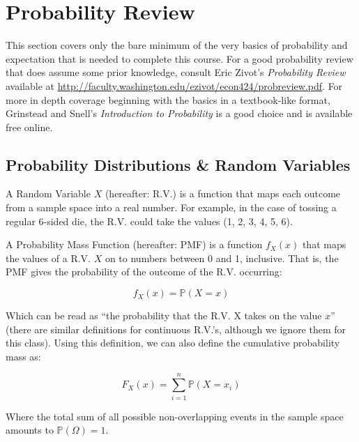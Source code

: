 \documentclass[]{book}
\theoremstyle{definition}
\theoremstyle{definition}
\theoremstyle{definition}
\theoremstyle{remark}
\begin{document}
\section*{Probability Review}\label{probability-review}

This section covers only the bare minimum of the very basics of
probability and expectation that is needed to complete this course. For
a good probability review that does assume some prior knowledge, consult
Eric Zivot's \emph{Probability Review} available at
\url{http://faculty.washington.edu/ezivot/econ424/probreview.pdf}. For
more in depth coverage beginning with the basics in a textbook-like
format, Grinstead and Snell's \emph{Introduction to Probability}
\citep{gs2006} is a good choice and is available free online.

\subsection*{Probability Distributions \& Random
Variables}\label{probability-distributions-random-variables}

A Random Variable \(X\) (hereafter: R.V.) is a function that maps each
outcome from a sample space into a real number. For example, in the case
of tossing a regular 6-sided die, the R.V. could take the values (1, 2,
3, 4, 5, 6).

A Probability Mass Function (hereafter: PMF) is a function \(f_X(x)\)
that maps the values of a R.V. \(X\) on to numbers between 0 and 1,
inclusive. That is, the PMF gives the probability of the outcome of the
R.V. occurring:

\begin{equation}
f_X(x) = \mathbb{P}(X = x)
\end{equation}

Which can be read as ``the probability that the R.V. X takes on the
value \(x\)'' (there are similar definitions for continuous R.V.'s,
although we ignore them for this class). Using this definition, we can
also define the cumulative probability mass as:

\begin{equation}
F_X(x) = \sum\limits_{i=1}^n \mathbb{P}(X = x_i)
\end{equation}

Where the total sum of all possible non-overlapping events in the sample
space amounts to \(\mathbb{P}(\Omega) = 1\).
\end{document}
